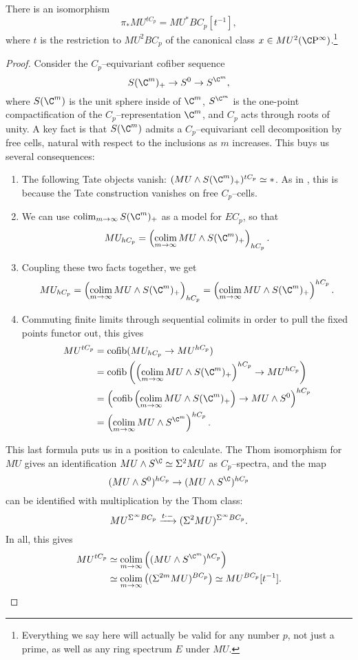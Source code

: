 \begin{theorem}\label{TateConstructionOnMU}
There is an isomorphism \[\pi_* MU^{tC_p} = MU^* BC_p[t^{-1}],\] where \(t\) is the restriction to \(MU^2 BC_p\) of the canonical class \(x \in MU^2(\CP^\infty)\).\footnote{Everything we say here will actually be valid for any number \(p\), not just a prime, as well as any ring spectrum \(E\) under \(MU\).}
\end{theorem}
\begin{proof}
Consider the \(C_p\)--equivariant cofiber sequence \[S(\C^m)_+ \to S^0 \to S^{\C^m},\] where \(S(\C^m)\) is the unit sphere inside of \(\C^m\), \(S^{\C^m}\) is the one-point compactification of the \(C_p\)--representation \(\C^m\), and \(C_p\) acts through roots of unity.  A key fact is that \(S(\C^m)\) admits a \(C_p\)--equivariant cell decomposition by free cells, natural with respect to the inclusions as \(m\) increases.  This buys us several consequences:
\begin{enumerate}
    \item The following Tate objects vanish: \((MU \sm S(\C^m)_+)^{tC_p} \simeq *\).  As in , this is because the Tate construction vanishes on free \(C_p\)--cells.
    \item We can use \(\colim_{m \to \infty} S(\C^m)_+\) as a model for \(EC_p\), so that \[MU_{hC_p} = \left( \colim_{m \to \infty} MU \sm S(\C^m)_+ \right)_{hC_p}.\]
    \item Coupling these two facts together, we get \[MU_{hC_p} = \left( \colim_{m \to \infty} MU \sm S(\C^m)_+ \right)_{hC_p} = \left( \colim_{m \to \infty} MU \sm S(\C^m)_+ \right)^{hC_p}.\]
    \item Commuting finite limits through sequential colimits in order to pull the fixed points functor out, this gives
    \begin{align*}
    MU^{tC_p} & = \cofib(MU_{hC_p} \to MU^{hC_p}) \\
    & = \cofib\left(\left( \colim_{m \to \infty} MU \sm S(\C^m)_+ \right)^{hC_p} \to MU^{hC_p}\right) \\
    & = \left(\cofib\left( \colim_{m \to \infty} MU \sm S(\C^m)_+ \right) \to MU \sm S^0\right)^{hC_p} \\
    & = \left( \colim_{m \to \infty} MU \sm S^{\C^m} \right)^{hC_p}.
    \end{align*}
\end{enumerate}
This last formula puts us in a position to calculate.  The Thom isomorphism for \(MU\) gives an identification \(MU \sm S^{\C} \simeq \Susp^2 MU\) as \(C_p\)--spectra, and the map \[(MU \sm S^0)^{hC_p} \to (MU \sm S^{\C})^{hC_p}\] can be identified with multiplication by the Thom class: \[MU^{\Sigma^\infty BC_p} \xrightarrow{t \cdot -} (\Sigma^2 MU)^{\Sigma^\infty BC_p}.\]  In all, this gives
\begin{align*}
MU^{tC_p} & \simeq \colim_{m \to \infty} \left((MU \sm S^{\C^m})^{hC_p}\right) \\
& \simeq \colim_{m \to \infty} \left((\Susp^{2m} MU)^{BC_p}\right) \simeq MU^{BC_p}[t^{-1}]. \qedhere
\end{align*}
\end{proof}


